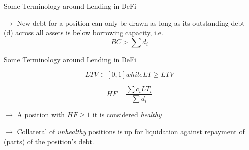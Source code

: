 \documentclass[handout]{beamer}
\begin{document}
\begin{frame}{Some Terminology around Lending in DeFi}

\vspace{1em}


	
		
$	\rightarrow$ New debt for a position can only be drawn as long as its outstanding debt (d) across all assets is below borrowing capacity, i.e.
\begin{equation}
	  BC > \sum d_i\label{eq:BC_restriction} 
	\end{equation}

	\vspace{1em}

\end{frame}

\begin{frame}{Some Terminology around Lending in DeFi}

\vspace{1em}

	
	 {\begin{equation}
	  LTV \in [0,1] while LT \geq LTV   \label{eq:LT} 
	\end{equation}}
	



\begin{equation}
	  HF = \frac{\sum c_i LT_i}{\sum d_i} \label{eq:HF} 
\end{equation}

	\vspace{1em}

 $	\rightarrow$ A position with $HF \geq 1$ it is considered \textit{healthy}
 
 \vspace{1em}

 $	\rightarrow$ Collateral of \textit{unhealthy} positions is up for liquidation against repayment of (parts) of the position’s debt.  


\end{frame}
\end{document}
